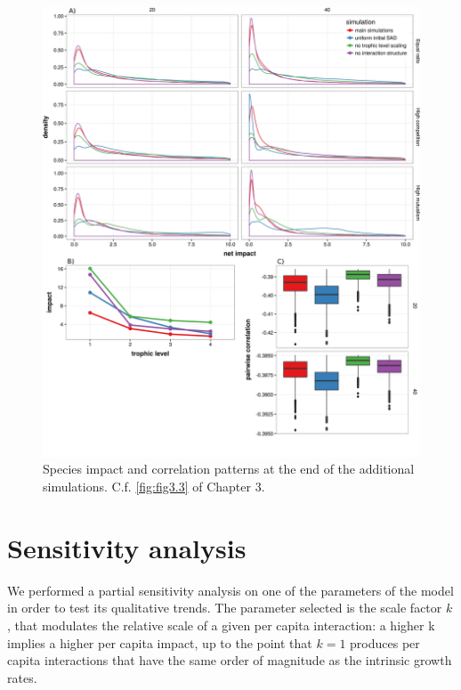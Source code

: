 \newpage

\begin{figure}[!htb]
\centering
\includegraphics[width=\textwidth]{./Figures/Appendix3_3/Fig_3.png}
\caption[Impact patterns of the additional simulations]{\color{Gray} Species impact and correlation patterns at the end of the additional simulations. C.f. \cref{fig:fig3.3} of Chapter 3.}
\label{fig:figApp3.3.3}
\end{figure}

\newpage

\section*{Sensitivity analysis}

We performed a partial sensitivity analysis on one of the parameters of the model in order to test its qualitative trends. The parameter selected is the scale factor $k$, that modulates the relative scale of a given per capita interaction: a higher k implies a higher per capita impact, up to the point that \(k = 1\) produces per capita interactions that have the same order of magnitude as the intrinsic growth rates.

